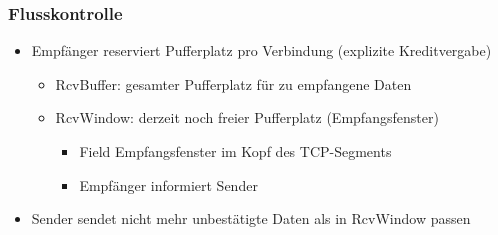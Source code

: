     \subsubsection{Flusskontrolle}
      \begin{itemize}
        \item Empfänger reserviert Pufferplatz pro Verbindung (explizite Kreditvergabe)
          \begin{itemize}
            \item RcvBuffer: gesamter Pufferplatz für zu empfangene Daten
            \item RcvWindow: derzeit noch freier Pufferplatz (Empfangsfenster)
              \begin{itemize}
                \item Field Empfangsfenster im Kopf des TCP-Segments
                \item Empfänger informiert Sender
              \end{itemize}
          \end{itemize}
        \item Sender sendet nicht mehr unbestätigte Daten als in RcvWindow passen
      \end{itemize}
